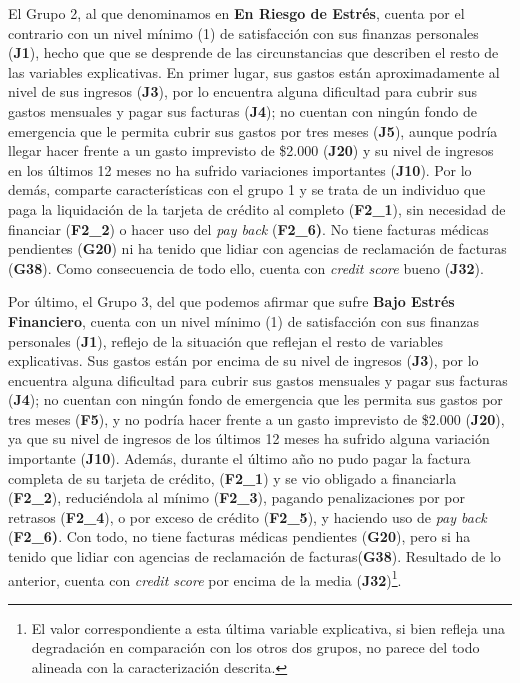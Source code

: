 \documentclass[a4paper, 11pt]{article}
\begin{document}
El Grupo 2, al que denominamos en \textbf{En Riesgo de Estrés}, cuenta por el contrario con
un nivel mínimo (1) de satisfacción con sus finanzas personales (\textbf{J1}), hecho que 
que se desprende de las circunstancias que describen el resto de las variables explicativas.
En primer lugar, sus gastos están aproximadamente al nivel de sus ingresos (\textbf{J3}),
por lo encuentra alguna dificultad para cubrir sus gastos mensuales y pagar sus facturas
(\textbf{J4}); no cuentan con ningún fondo de emergencia que le permita cubrir 
sus gastos por tres meses (\textbf{J5}), aunque podría llegar hacer frente a un gasto 
imprevisto de \$2.000 (\textbf{J20}) y su nivel de ingresos en los últimos 12 meses no 
ha sufrido variaciones importantes (\textbf{J10}). Por lo demás, comparte características
con el grupo 1 y se trata de un individuo que paga la liquidación de la tarjeta de crédito
al completo (\textbf{F2\_1}), sin necesidad de financiar (\textbf{F2\_2}) o hacer uso del
\textit{pay back} (\textbf{F2\_6)}. No tiene facturas médicas pendientes (\textbf{G20}) 
ni ha tenido que lidiar con agencias de reclamación de facturas (\textbf{G38}).
Como consecuencia de todo ello, cuenta con \textit{credit score} bueno (\textbf{J32}). 

Por último, el Grupo 3, del que podemos afirmar que sufre \textbf{Bajo Estrés Financiero}, 
cuenta con un nivel mínimo (1) de satisfacción con sus finanzas personales (\textbf{J1}),
reflejo de la situación que reflejan el resto de variables explicativas. Sus gastos están
por encima de su nivel de ingresos (\textbf{J3}), por lo encuentra alguna dificultad para
cubrir sus gastos mensuales y pagar sus facturas (\textbf{J4}); no cuentan con ningún
fondo de emergencia que les permita sus gastos por tres meses (\textbf{F5}), y no podría 
hacer frente a un gasto imprevisto de \$2.000 (\textbf{J20}), ya que su nivel de ingresos 
de los últimos 12 meses ha sufrido alguna variación importante (\textbf{J10}). 
Además, durante el último año no pudo pagar la factura completa de su tarjeta de crédito,
(\textbf{F2\_1}) y se vio obligado a financiarla (\textbf{F2\_2}), reduciéndola al mínimo
(\textbf{F2\_3}), pagando penalizaciones por por retrasos (\textbf{F2\_4}), o por exceso de
crédito (\textbf{F2\_5}), y haciendo uso de \textit{pay back} (\textbf{F2\_6)}.
Con todo, no tiene facturas médicas pendientes (\textbf{G20}), pero si ha tenido que lidiar
con agencias de reclamación de facturas(\textbf{G38}). Resultado de lo anterior, cuenta con \textit{credit score} por encima de la media (\textbf{J32})\footnote{El valor 
correspondiente a esta última variable explicativa, si bien refleja una degradación en
comparación con los otros dos grupos, no parece del todo alineada con la caracterización
descrita.}. 
\end{document}
